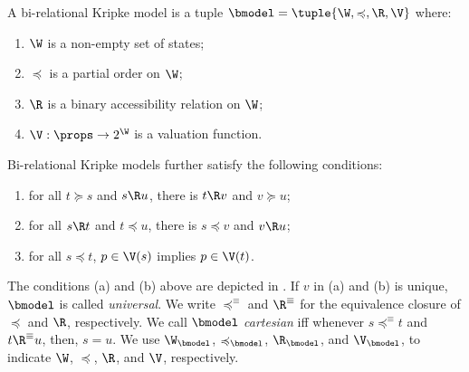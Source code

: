 
\begin{definition}\label{def:bmodel}
  A bi-relational Kripke model is a tuple $\bmodel = \tuple{\W, {\preccurlyeq}, \R, \V}$ where:
  \begin{enumerate}
    \setlength{\itemsep}{0pt}
    \item $\W$ is a non-empty set of states;
    \item $\preccurlyeq$ is a partial order on $\W$;
    \item $\R$ is a binary accessibility relation on $\W$;
    \item $\V: \props \to 2^{\W}$ is a valuation function.
  \end{enumerate}
  Bi-relational Kripke models further satisfy the following conditions:
  \begin{enumerate}[label=(\alph*)]
    \setlength{\itemsep}{0pt}
    \item for all $t \succcurlyeq s$ and $s \R u$, there is $t \R v$ and $v \succcurlyeq u$;
    \item for all $s \R t$ and $t \preccurlyeq u$, there is $s \preccurlyeq v$ and $v \R u$;
    \item for all $s \preccurlyeq t$, $p \in \V(s)$ implies $p \in \V(t)$.
  \end{enumerate}
  The conditions (a) and (b) above are depicted in .
  If $v$ in (a) and (b) is unique, $\bmodel$ is called \emph{universal}.
  We write $\preccurlyeq^{\equiv}$ and $\R^{\equiv}$ for the equivalence closure of $\preccurlyeq$ and $\R$, respectively.
  We call $\bmodel$ \emph{cartesian} iff whenever $s \preccurlyeq^{\equiv} t$ and $t \R^{\equiv} u$, then, $s = u$.
  We use $\W_{\bmodel}$, $\preccurlyeq_{\bmodel}$, $\R_{\bmodel}$, and $\V_{\bmodel}$, to indicate $\W$, $\preccurlyeq$, $\R$, and $\V$, respectively.
\end{definition}

